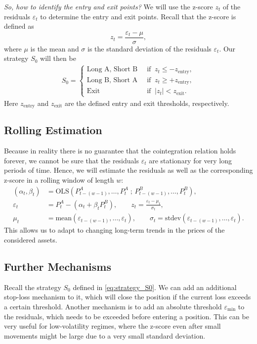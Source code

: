 \documentclass{article}
\begin{document}
\emph{So, how to identify the entry and exit points?} 
We will use the z-score \(z_t\) of the residuals \(\varepsilon_t\) to determine the entry and exit points.
Recall that the z-score is defined as
\[
z_t = \frac{\varepsilon_t - \mu}{\sigma},
\]
where \(\mu\) is the mean and \(\sigma\) is the standard deviation of the residuals \(\varepsilon_t\).
Our strategy $S_0$ will then be
\begin{align}
    S_0 = \begin{cases}
        \text{Long A, Short B} &\;\;\text{if}\;\; z_t \le -z_{\mathrm{entry}},\\
        \text{Long B, Short A} &\;\;\text{if}\;\; z_t \ge +z_{\mathrm{entry}},\\
        \text{Exit} &\;\;\text{if}\;\; |z_t| < z_{\mathrm{exit}}.
    \end{cases} \label{eq:strategy_S0}
\end{align}
Here \(z_{\mathrm{entry}}\) and \(z_{\mathrm{exit}}\) are the defined entry and exit thresholds, respectively.

\subsection{Rolling Estimation}
Because in reality there is no guarantee that the cointegration relation holds forever, we cannot be sure that the residuals $\varepsilon_t$ are stationary for very long periods of time.
Hence, we will estimate the residuals as well as the corresponding z-score in a rolling window of length $w$:
\begin{align*}
(\alpha_t,\beta_t) &= \text{OLS}\left(P_{t-(w-1)}^{A},\dots,P_{t}^{A}\;
\text{; } P_{t-(w-1)}^{B},\dots,P_{t}^{B}\right), \\
\varepsilon_t &= P_t^{A} - (\alpha_t + \beta_t P_t^{B}), \qquad z_t = \frac{\varepsilon_t - \mu_{t}}{\sigma_{t}}, \\
\mu_{t} &= \text{mean} \left(\varepsilon_{t-(w-1)},\dots,\varepsilon_{t}\right), \qquad
\sigma_{t} = \text{stdev}\left(\varepsilon_{t-(w-1)},\dots,\varepsilon_{t}\right).
\end{align*}
This allows us to adapt to changing long-term trends in the prices of the considered assets.

\subsection{Further Mechanisms}
Recall the strategy $S_0$ defined in \eqref{eq:strategy_S0}. We can add an additional stop-loss mechanism to it, which will close the position if the current loss exceeds a certain threshold.
Another mechanism is to add an absolute threshold $\varepsilon_{\mathrm{min}}$ to the residuals, which needs to be exceeded before entering a position.
This can be very useful for low-volatility regimes, where the z-score even after small movements might be large due to a very small standard deviation.
\end{document}
